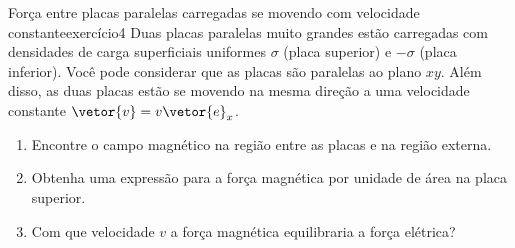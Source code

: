 \begin{exercício}{Força entre placas paralelas carregadas se movendo com velocidade constante}{exercício4}
    Duas placas paralelas muito grandes estão carregadas com densidades de carga superficiais uniformes \(\sigma\) (placa superior) e \(-\sigma\) (placa inferior). Você pode considerar que as placas são paralelas ao plano \(xy\). Além disso, as duas placas estão se movendo na mesma direção a uma velocidade constante \(\vetor{v} = v\vetor{e}_x\).
    \begin{enumerate}[label=(\alph*)]
        \item Encontre o campo magnético na região entre as placas e na região externa.
        \item Obtenha uma expressão para a força magnética por unidade de área na placa superior.
        \item Com que velocidade \(v\) a força magnética equilibraria a força elétrica?
    \end{enumerate}
\end{exercício}
